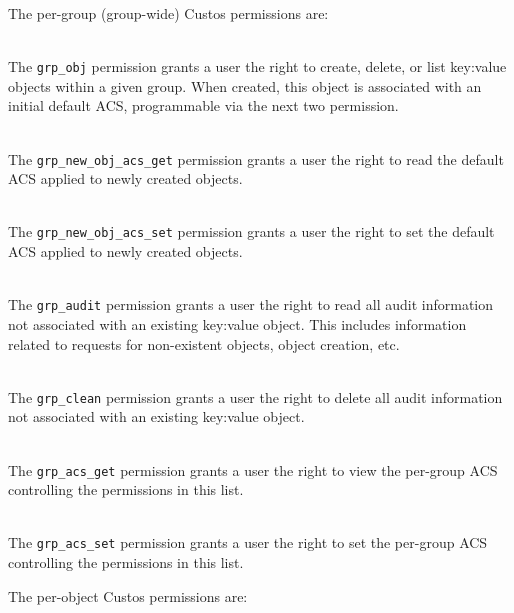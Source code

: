 \noindent
The per-group (group-wide) Custos permissions are:

\begin{packed_desc}
\item[\texttt{grp\_obj}] \hfill \\ The \texttt{grp\_obj}
  permission grants a user the right to create, delete, or list
  key:value objects within a given group. When created, this object is
  associated with an initial default ACS, programmable via the next
  two permission.
\item[\texttt{grp\_new\_obj\_acs\_get}] \hfill \\ The
  \texttt{grp\_new\_obj\_acs\_get} permission grants a user the right
  to read the default ACS applied to newly created objects.
\item[\texttt{grp\_new\_obj\_acs\_set}] \hfill \\ The
  \texttt{grp\_new\_obj\_acs\_set} permission grants a user the right
  to set the default ACS applied to newly created objects.
\item[\texttt{grp\_audit}] \hfill \\ The \texttt{grp\_audit}
  permission grants a user the right to read all audit information not
  associated with an existing key:value object. This includes
  information related to requests for non-existent objects, object
  creation, etc.
\item[\texttt{grp\_clean}] \hfill \\ The \texttt{grp\_clean}
  permission grants a user the right to delete all audit information
  not associated with an existing key:value object.
\item[\texttt{grp\_acs\_get}] \hfill \\ The \texttt{grp\_acs\_get}
  permission grants a user the right to view the per-group ACS
  controlling the permissions in this list.
\item[\texttt{grp\_acs\_set}] \hfill \\ The \texttt{grp\_acs\_set}
  permission grants a user the right to set the per-group ACS
  controlling the permissions in this list.
\end{packed_desc}

\noindent
The per-object Custos permissions are:

